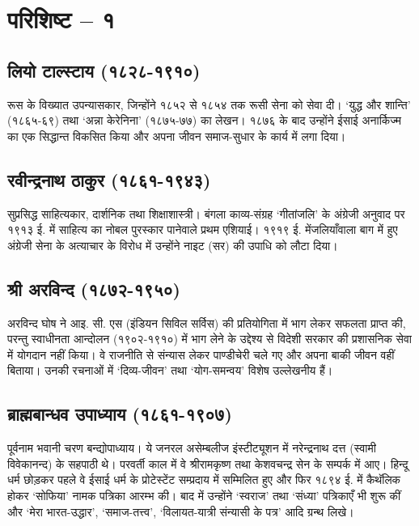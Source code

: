 
\chapter{परिशिष्ट – १}

\section*{लियो टाल्स्टाय (१८२८-१९१०) }

रूस के विख्यात उपन्यासकार, जिन्होंने १८५२ से १८५४ तक रूसी सेना को सेवा दी। ‘युद्ध और शान्ति’ (१८६५-६९) तथा ‘अन्ना केरेनिना’ (१८७५-७७) का लेखन। १८७६ के बाद उन्होंने ईसाई अनार्किज्म का एक सिद्धान्त विकसित किया और अपना जीवन समाज-सुधार के कार्य में लगा दिया। 

\section*{रवीन्द्रनाथ ठाकुर (१८६१-१९४३) }

सुप्रसिद्ध साहित्यकार, दार्शनिक तथा शिक्षाशास्त्री। बंगला काव्य-संग्रह ‘गीतांजलि’ के अंग्रेजी अनुवाद पर १९१३ ई. में साहित्य का नोबल पुरस्कार पानेवाले प्रथम एशियाई। १९१९ ई. में\break जलियाँवाला बाग में हुए अंग्रेजी सेना के अत्याचार के विरोध में उन्होंने नाइट (सर) की उपाधि को लौटा दिया। 

\section*{श्री अरविन्द (१८७२-१९५०) }

अरविन्द घोष ने आइ. सी. एस (इंडियन सिविल सर्विस) की प्रतियोगिता में भाग लेकर सफलता प्राप्त की, परन्तु स्वाधीनता आन्दोलन (१९०२-१९१०) में भाग लेने के उद्देश्य से विदेशी सरकार की प्रशासनिक सेवा में योगदान नहीं किया। वे राजनीति से संन्यास लेकर पाण्डीचेरी चले गए और अपना बाकी जीवन वहीं बिताया। उनकी रचनाओं में ‘दिव्य-जीवन’ तथा ‘योग-समन्वय’ विशेष उल्लेखनीय हैं। 

\section*{ब्राह्मबान्धव उपाध्याय (१८६१-१९०७) }

पूर्वनाम भवानी चरण बन्द्योपाध्याय। ये जनरल असेम्बलीज इंस्टीट्यूशन में नरेन्द्रनाथ दत्त (स्वामी विवेकानन्द) के सहपाठी थे। परवर्ती काल में वे श्रीरामकृष्ण तथा केशवचन्द्र सेन के सम्पर्क में आए। हिन्दू धर्म छोड़कर पहले वे ईसाई धर्म के प्रोटेस्टेंट सम्प्रदाय में सम्मिलित हुए और फिर १८९४ ई. में कैथॅलिक होकर ‘सोफिया’ नामक पत्रिका आरम्भ की। बाद में उन्होंने ‘स्वराज’ तथा ‘संध्या’ पत्रिकाएँ भी शुरू कीं और ‘मेरा भारत-उद्धार’, ‘समाज-तत्त्व’, ‘विलायत-यात्री संन्यासी के पत्र’ आदि ग्रन्थ लिखे। 

